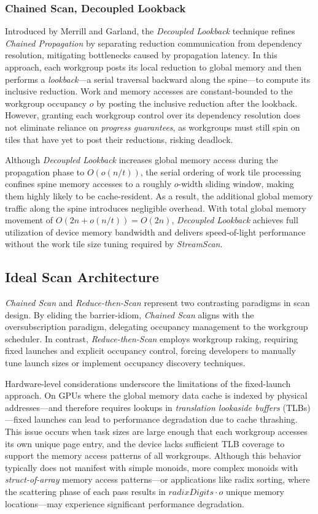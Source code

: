 \documentclass[acmsmall, manuscript, screen, review, anonymous]{acmart}
\begin{document}
\subsubsection{Chained Scan, Decoupled Lookback}
Introduced by Merrill and Garland, the \emph{Decoupled Lookback} technique refines \emph{Chained Propagation} by separating reduction communication from dependency resolution, mitigating bottlenecks caused by propagation latency. In this approach, each workgroup posts its local reduction to global memory and then performs a \emph{lookback}---a serial traversal backward along the spine---to compute its inclusive reduction. Work and memory accesses are constant-bounded to the workgroup occupancy $o$ by posting the inclusive reduction after the lookback. However, granting each workgroup control over its dependency resolution does not eliminate reliance on \emph{progress guarantees}, as workgroups must still spin on tiles that have yet to post their reductions, risking deadlock.

Although \emph{Decoupled Lookback} increases global memory access during the propagation phase to $O(o(n/t))$, the serial ordering of work tile processing confines spine memory accesses to a roughly $o$-width sliding window, making them highly likely to be cache-resident. As a result, the additional global memory traffic along the spine introduces negligible overhead. With total global memory movement of $O(2n+o(n/t))= O(2n)$, \emph{Decoupled Lookback} achieves full utilization of device memory bandwidth and delivers speed-of-light performance without the work tile size tuning required by \emph{StreamScan}.

\subsection{Ideal Scan Architecture}
\emph{Chained Scan} and \emph{Reduce-then-Scan} represent two contrasting paradigms in scan design. By eliding the barrier-idiom, \emph{Chained Scan} aligns with the oversubscription paradigm, delegating occupancy management to the workgroup scheduler. In contrast, \emph{Reduce-then-Scan} employs workgroup raking, requiring fixed launches and explicit occupancy control, forcing developers to manually tune launch sizes or implement occupancy discovery techniques.

Hardware-level considerations underscore the limitations of the fixed-launch approach. On GPUs where the global memory data cache is indexed by physical addresses---and therefore requires lookups in \emph{translation lookaside buffers} (TLBs)---fixed launches can lead to performance degradation due to cache thrashing. This issue occurs when task sizes are large enough that each workgroup accesses its own unique page entry, and the device lacks sufficient TLB coverage to support the memory access patterns of all workgroups. Although this behavior typically does not manifest with simple monoids, more complex monoids with \emph{struct-of-array} memory access patterns---or applications like radix sorting, where the scattering phase of each pass results in $radixDigits \cdot o$ unique memory locations---may experience significant performance degradation.
\end{document}
